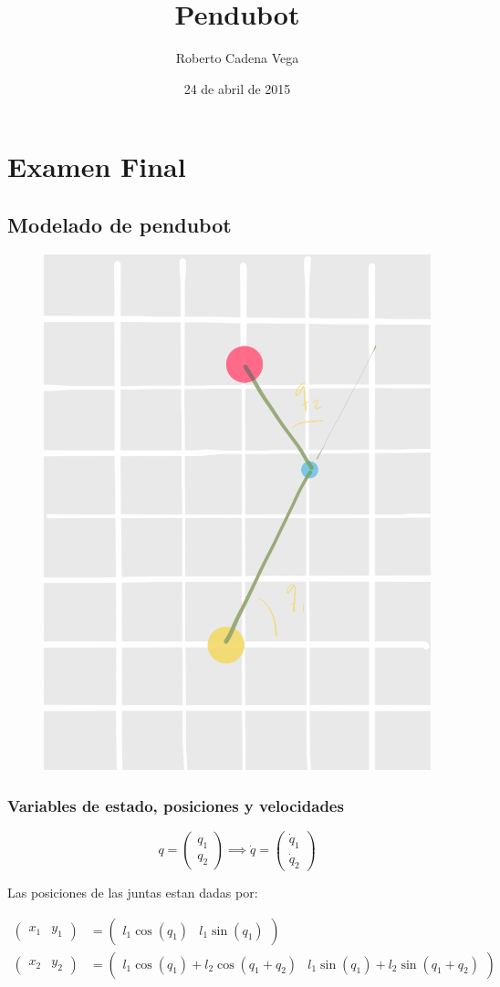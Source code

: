 \documentclass{article}
\title{Pendubot}
\author{Roberto Cadena Vega}
\date{24 de abril de 2015}
\begin{document}
    
    
    \maketitle
    
    \section*{Examen Final}\label{examen-final}

    \subsection*{Modelado de pendubot}\label{modelado-de-pendubot}

    \begin{figure}[htbp]
\centering
\includegraphics[width=0.3\linewidth]{./imagenes/doblependulo.PNG}
\end{figure}

    \subsubsection*{Variables de estado, posiciones y
velocidades}\label{variables-de-estado-posiciones-y-velocidades}

    \[
q = 
\begin{pmatrix}
q_1 \\
q_2
\end{pmatrix} \implies
\dot{q} =
\begin{pmatrix}
\dot{q}_1 \\
\dot{q}_2
\end{pmatrix}
\]

Las posiciones de las juntas estan dadas por:

\[
\begin{align}
\begin{pmatrix}
x_1 & y_1
\end{pmatrix} &= 
\begin{pmatrix}
l_1 \cos{(q_1)} & l_1 \sin{(q_1)}
\end{pmatrix} \\
\begin{pmatrix}
x_2 & y_2
\end{pmatrix} &= 
\begin{pmatrix}
l_1 \cos{(q_1)} + l_2 \cos{(q_1 + q_2)} & l_1 \sin{(q_1)} + l_2 \sin{(q_1 + q_2)}
\end{pmatrix}
\end{align}
\]
\end{document}
